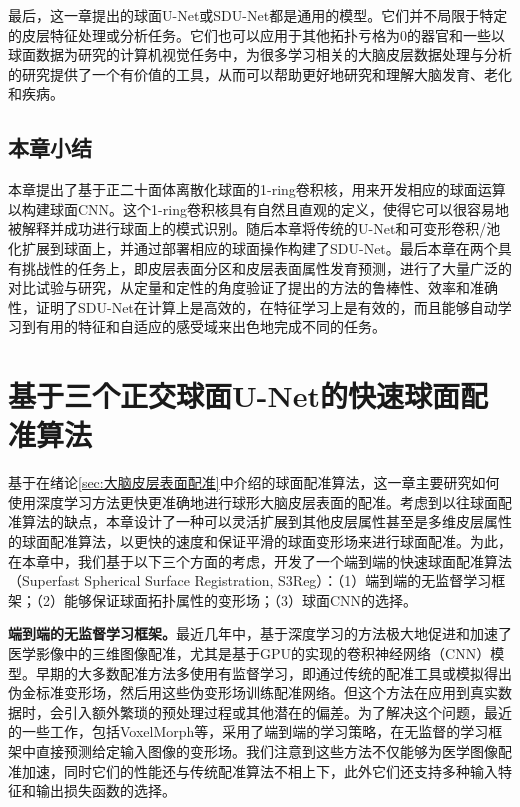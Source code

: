 最后，这一章提出的球面U-Net或SDU-Net都是通用的模型。它们并不局限于特定的皮层特征处理或分析任务。它们也可以应用于其他拓扑亏格为0的器官和一些以球面数据为研究的计算机视觉任务中，为很多学习相关的大脑皮层数据处理与分析的研究提供了一个有价值的工具，从而可以帮助更好地研究和理解大脑发育、老化和疾病。

\section{本章小结}
本章提出了基于正二十面体离散化球面的1-ring卷积核，用来开发相应的球面运算以构建球面CNN。这个1-ring卷积核具有自然且直观的定义，使得它可以很容易地被解释并成功进行球面上的模式识别。随后本章将传统的U-Net和可变形卷积/池化扩展到球面上，并通过部署相应的球面操作构建了SDU-Net。最后本章在两个具有挑战性的任务上，即皮层表面分区和皮层表面属性发育预测，进行了大量广泛的对比试验与研究，从定量和定性的角度验证了提出的方法的鲁棒性、效率和准确性，证明了SDU-Net在计算上是高效的，在特征学习上是有效的，而且能够自动学习到有用的特征和自适应的感受域来出色地完成不同的任务。









\chapter{基于三个正交球面U-Net的快速球面配准算法}\label{sec:基于三个正交球面U-Net的快速球面配准算法}

基于在绪论\ref{sec:大脑皮层表面配准}中介绍的球面配准算法，这一章主要研究如何使用深度学习方法更快更准确地进行球形大脑皮层表面的配准。考虑到以往球面配准算法的缺点，本章设计了一种可以灵活扩展到其他皮层属性甚至是多维皮层属性的球面配准算法，以更快的速度和保证平滑的球面变形场来进行球面配准。为此，在本章中，我们基于以下三个方面的考虑，开发了一个端到端的快速球面配准算法（Superfast Spherical Surface Registration, S3Reg）：（1）端到端的无监督学习框架；（2）能够保证球面拓扑属性的变形场；（3）球面CNN的选择。

\textbf{端到端的无监督学习框架。}最近几年中，基于深度学习的方法极大地促进和加速了医学影像中的三维图像配准，尤其是基于GPU的实现的卷积神经网络（CNN）模型\cite{dalca2018unsupervised,balakrishnan2018unsupervised,niethammer2019metric}。早期的大多数配准方法\cite{krebs2017robust,rohe2017svf}多使用有监督学习，即通过传统的配准工具或模拟得出伪金标准变形场，然后用这些伪变形场训练配准网络。但这个方法在应用到真实数据时，会引入额外繁琐的预处理过程或其他潜在的偏差。为了解决这个问题，最近的一些工作\cite{dalca2018unsupervised,balakrishnan2018unsupervised,niethammer2019metric,de2019deep,zhou2020unsupervised}，包括VoxelMorph\cite{balakrishnan2018unsupervised}等，采用了端到端的学习策略，在无监督的学习框架中直接预测给定输入图像的变形场。我们注意到这些方法不仅能够为医学图像配准加速，同时它们的性能还与传统配准算法不相上下，此外它们还支持多种输入特征和输出损失函数的选择。

